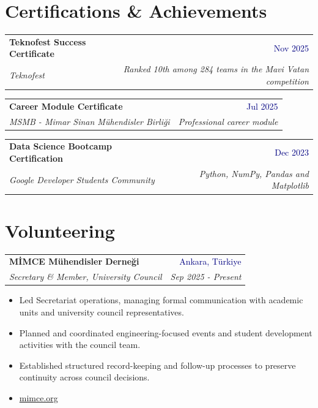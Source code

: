 \documentclass[10pt,letterpaper]{article}
\makeatletter
\newif\ifmiddlemimce
\newif\ifallcv
\newcommand{\entry}[4]{%
  \begin{tabularx}{\textwidth}{@{}Xr@{}}
    \textbf{#1} & \textcolor{navy}{#2}\\
    \textit{#3} & \textit{#4}
  \end{tabularx}\vspace{1pt}}
\makeatother
\begin{document}
\section{Certifications \& Achievements}
\entry{Teknofest Success Certificate}{Nov 2025}{Teknofest}{Ranked 10th among 284 teams in the Mavi Vatan competition}
\entry{Career Module Certificate}{Jul 2025}{MSMB - Mimar Sinan Mühendisler Birliği}{Professional career module}
\entry{Data Science Bootcamp Certification}{Dec 2023}{Google Developer Students Community}{Python, NumPy, Pandas and Matplotlib}

\ifmiddlemimce\else
  \section{Volunteering}
  \entry{MİMCE Mühendisler Derneği}{Ankara, Türkiye}
        {Secretary \& Member, University Council}{Sep 2025 - Present}
  \begin{itemize}
    \item Led Secretariat operations, managing formal communication with academic units and university council representatives.
    \item Planned and coordinated engineering-focused events and student development activities with the council team.
    \item Established structured record-keeping and follow-up processes to preserve continuity across council decisions.
    \item \href{https://mimce.org/}{mimce.org}
  \end{itemize}
\fi

\ifallcv
\end{document}
